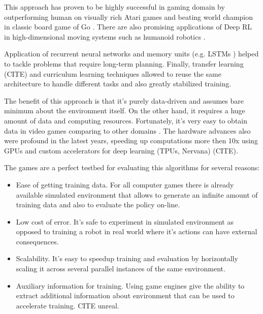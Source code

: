 This approach has proven to be highly successful in gaming domain by outperforming human on visually rich Atari games \cite{Atari} and beating world champion in classic board game of Go \cite{AlphaGo}.
There are also promising applications of Deep RL in high-dimensional moving systems such as humanoid robotics \cite{Robotics}.

Application of recurrent neural networks\cite{RLRNN} and memory units (e.g. LSTMs \cite{TextGamesLSTM}) helped to tackle problems that require long-term planning.
Finally, transfer learning (CITE) and curriculum learning \cite{Curriculum} techniques allowed to reuse the same architecture to handle different tasks and also greatly stabilized training.

The benefit of this approach is that it's purely data-driven and assumes bare minimum about the environment itself. On the other hand, it requires a huge amount of data and computing resources.
Fortunately, it's very easy to obtain data in video games comparing to other domains \cite{TrainInGames}. The hardware advances also were profound in the latest years, speeding up computations more then 10x using GPUs and custom accelerators for deep learning (TPUs, Nervana) (CITE).


The games are a perfect testbed for evaluating this algorithms for several reasons:
\begin{itemize}
    \item Ease of getting training data. For all computer games there is already available simulated environment that allows to generate
        an infinite amount of training data and also to evaluate the policy on-line.
    \item Low cost of error. It's safe to experiment in simulated environment as opposed to training a robot in real world where it's actions can have external consequences. 
    \item Scalability. It's easy to speedup training and evaluation by horizontally scaling it across several parallel instances of the same environment.
    \item Auxiliary information for training. Using game engines give the ability to extract additional information about environment that can be used to accelerate training. CITE unreal.
\end{itemize}


